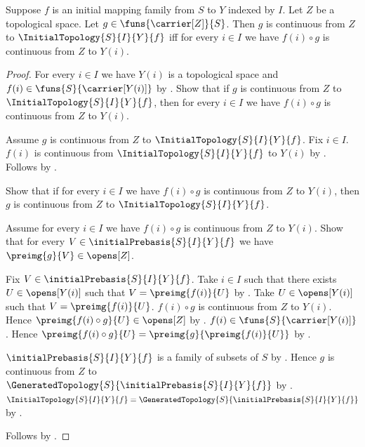\begin{theorem}\label{initial_topology_universal_property}
    Suppose $f$ is an initial mapping family from $S$ to $Y$ indexed by $I$.
    Let $Z$ be a topological space.
    Let $g\in\funs{\carrier[Z]}{S}$.
    Then $g$ is continuous from $Z$ to $\InitialTopology{S}{I}{Y}{f}$ iff
        for every $i\in I$ we have
            $f(i)\circ g$ is continuous from $Z$ to $Y(i)$.
\end{theorem}
\begin{proof}
    For every $i\in I$ we have $Y(i)$ is a topological space and
        $f(i)\in\funs{S}{\carrier[Y(i)]}$ by
        .
    Show that if $g$ is continuous from $Z$ to
        $\InitialTopology{S}{I}{Y}{f}$, then for every $i\in I$ we have
        $f(i)\circ g$ is continuous from $Z$ to $Y(i)$.
    \begin{subproof}
        Assume $g$ is continuous from $Z$ to
            $\InitialTopology{S}{I}{Y}{f}$.
        Fix $i\in I$.
        $f(i)$ is continuous from $\InitialTopology{S}{I}{Y}{f}$
            to $Y(i)$ by .
        Follows by .
    \end{subproof}

    Show that if for every $i\in I$ we have
        $f(i)\circ g$ is continuous from $Z$ to $Y(i)$, then
        $g$ is continuous from $Z$ to $\InitialTopology{S}{I}{Y}{f}$.
    \begin{subproof}
        Assume for every $i\in I$ we have
            $f(i)\circ g$ is continuous from $Z$ to $Y(i)$.
        Show that for every $V\in\initialPrebasis{S}{I}{Y}{f}$ we have
            $\preimg{g}{V}\in\opens[Z]$.
        \begin{subproof}
            Fix $V\in\initialPrebasis{S}{I}{Y}{f}$.
            Take $i\in I$ such that there exists $U\in\opens[Y(i)]$
                such that $V=\preimg{f(i)}{U}$ by
                .
            Take $U\in\opens[Y(i)]$ such that
                $V=\preimg{f(i)}{U}$.
            $f(i)\circ g$ is continuous from $Z$ to $Y(i)$.
            Hence $\preimg{f(i)\circ g}{U}\in\opens[Z]$ by
                .
            $f(i)\in\funs{S}{\carrier[Y(i)]}$.
            Hence $\preimg{f(i)\circ g}{U}
                =\preimg{g}{\preimg{f(i)}{U}}$ by
                .
        \end{subproof}
        $\initialPrebasis{S}{I}{Y}{f}$ is a family of subsets of $S$ by
            .
        Hence $g$ is continuous from $Z$ to
            $\GeneratedTopology{S}{\initialPrebasis{S}{I}{Y}{f}}$ by
            .
        $\InitialTopology{S}{I}{Y}{f}
            =\GeneratedTopology{S}{\initialPrebasis{S}{I}{Y}{f}}$ by
            .
    \end{subproof}
    Follows by \auto.
\end{proof}


